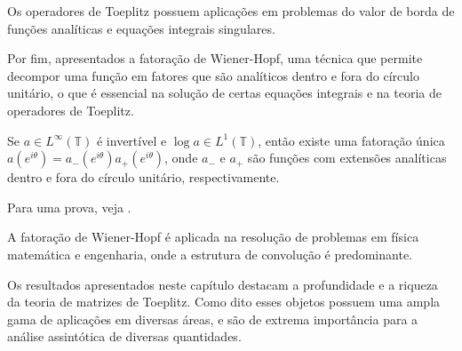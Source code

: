 Os operadores de Toeplitz possuem aplicações em problemas do valor de borda de funções analíticas e equações integrais singulares.

Por fim, apresentados a fatoração de Wiener-Hopf, uma técnica que permite decompor uma função em fatores que são analíticos dentro e fora do círculo unitário, o que é essencial na solução de certas equações integrais e na teoria de operadores de Toeplitz.
\begin{theorem*}
  Se $a \in L^\infty(\mathbb{T})$ é invertível e $\log a \in L^1(\mathbb{T})$, então existe uma fatoração única $a(e^{i\theta}) = a_-(e^{i\theta}) a_+(e^{i\theta})$, onde $a_-$ e $a_+$ são funções com extensões analíticas dentro e fora do círculo unitário, respectivamente.
\end{theorem*}
Para uma prova, veja \cite{wiener1931}.

A fatoração de Wiener-Hopf é aplicada na resolução de problemas em física matemática e engenharia, onde a estrutura de convolução é predominante.

Os resultados apresentados neste capítulo destacam a profundidade e a riqueza da teoria de matrizes de Toeplitz. Como dito esses objetos possuem uma ampla gama de aplicações em diversas áreas, e são de extrema importância para a análise assintótica de diversas quantidades.
